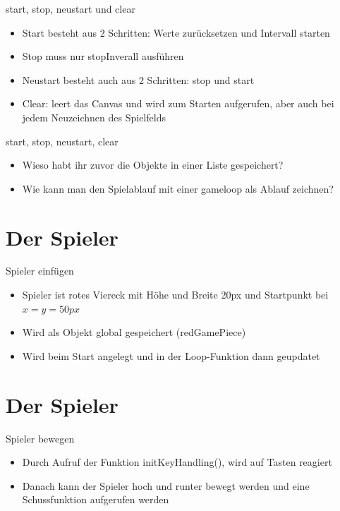 \documentclass[18pt]{beamer}
\begin{document}
\begin{frame}{start, stop, neustart und clear}
\begin{itemize}
	\item Start besteht aus 2 Schritten: Werte zurücksetzen und Intervall starten
	\item Stop muss nur stopInverall ausführen
	\item Neustart besteht auch aus 2 Schritten: stop und start
	\item Clear: leert das Canvas und wird zum Starten aufgerufen, aber auch bei jedem Neuzeichnen des Spielfelds

\end{itemize}
\end{frame}

\begin{frame}{start, stop, neustart, clear}
\begin{itemize}
	\item Wieso habt ihr zuvor die Objekte in einer Liste gespeichert?
	\item Wie kann man den Spielablauf mit einer gameloop als Ablauf zeichnen?
	
\end{itemize}
\end{frame}


\section{Der Spieler}
\begin{frame}{Spieler einfügen}
\begin{itemize}
	\item Spieler ist rotes Viereck mit Höhe und Breite 20px und Startpunkt bei $x=y=50px$
	\item Wird als Objekt global gespeichert (\glqq redGamePiece\grqq )
	\item Wird beim Start angelegt und in der Loop-Funktion dann geupdatet
\end{itemize}
\end{frame}

\section{Der Spieler}
\begin{frame}{Spieler bewegen}
\begin{itemize}
	\item Durch Aufruf der Funktion \glqq initKeyHandling()\grqq{}, wird auf Tasten reagiert
	\item Danach kann der Spieler hoch und runter bewegt werden und eine Schussfunktion aufgerufen werden
\end{itemize}
\end{frame}
\end{document}
